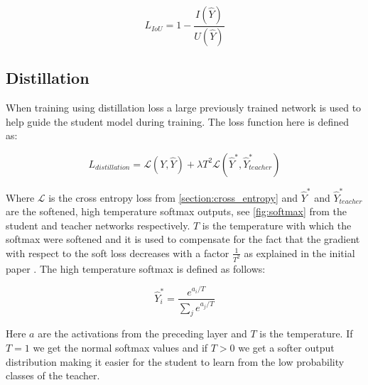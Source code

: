 \documentclass{kththesis}
\begin{document}
\[L_{\textit{IoU}} = 1 - \frac{I(\hat{Y})}{U(\hat{Y})}\]


\subsection{Distillation}
When training using distillation loss \parencite{hinton2015distilling} a large
previously trained network is used to help guide the student model during
training. The loss function here is defined as:

\[L_{distillation} = \mathcal{L}(Y, \hat{Y}) + \lambda T^2\mathcal{L}(\hat{Y}^*, \hat{Y}_{teacher}^*)\]

Where \(\mathcal{L}\) is the cross entropy loss from
\cref{section:cross_entropy} and \(\hat{Y}^*\) and \(\hat{Y}^*_{teacher}\) are the softened,
high temperature softmax outputs, see \cref{fig:softmax} from the student and teacher networks
respectively. \(T\) is the temperature with which the softmax were softened and
it is used to compensate for the fact that the gradient with respect to the soft
loss decreases with a factor \(\frac{1}{T^2}\) as explained in the initial
paper \parencite{hinton2015distilling}. The high temperature softmax is defined
as follows: 

\[\hat{Y}_i^* = \frac{e^{a_i/T}}{\sum_j e^{a_j/T}}\]

Here \(a\) are the activations from the preceding layer and \(T\) is the
temperature. If \(T = 1\) we get the normal softmax values and if \(T > 0\) we
get a softer output distribution making it easier for the student to learn from
the low probability classes of the teacher. 
\end{document}
